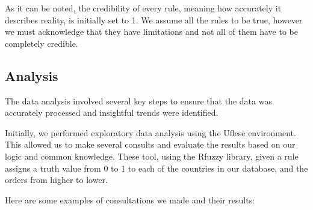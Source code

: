 \documentclass[fleqn,11pt]{article}
\begin{document}
As it can be noted, the credibility of every rule, meaning how accurately it describes reality, is initially set to 1. We assume all the rules to be true, however we must acknowledge that they have limitations and not all of them have to be completely credible.

\subsection{Analysis}

The data analysis involved several key steps to ensure that the data was accurately processed and insightful trends were identified.

Initially, we performed exploratory data analysis using the Uflese environment. This allowed us to make several consults and evaluate the results based on our logic and common knowledge. These tool, using the Rfuzzy library, given a rule assigns a truth value from 0 to 1 to each of the countries in our database, and the orders from higher to lower. 

Here are some examples of consultations we made and their results:
\end{document}
